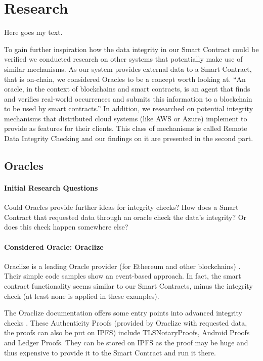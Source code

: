 \section{Research}

Here goes my text.

To gain further inspiration how the data integrity in our Smart Contract could be verified we conducted research on other systems that potentially make use of similar mechanisms. As our system provides external data to a Smart Contract, that is on-chain, we considered Oracles to be a concept worth looking at. “An oracle, in the context of blockchains and smart contracts, is an agent that finds and verifies real-world occurrences and submits this information to a blockchain to be used by smart contracts.” \cite{relatedWork01} In addition, we researched on potential integrity mechanisms that distributed cloud systems (like AWS or Azure) implement to provide as features for their clients. This class of mechanisms is called Remote Data Integrity Checking and our findings on it are presented in the second part.

\subsection{Oracles}

\paragraph{Initial Research Questions}
Could Oracles provide further ideas for integrity checks? How does a Smart Contract that requested data through an oracle check the data’s integrity? Or does this check happen somewhere else?

\paragraph{Considered Oracle: Oraclize}
Oraclize is a leading Oracle provider (for Ethereum and other blockchains) \cite{relatedWork02}. Their simple code samples \cite{relatedWork03} show an event-based approach. In fact, the smart contract functionality seems similar to our Smart Contracts, minus the integrity check (at least none is applied in these examples).

The Oraclize documentation offers some entry points into advanced integrity checks \cite{relatedWork04}. These Authenticity Proofs (provided by Oraclize with requested data, the proofs can also be put on IPFS) \cite{relatedWork05} include TLSNotaryProofs, Android Proofs and Ledger Proofs. They can be stored on IPFS as the proof may be huge and thus expensive to provide it to the Smart Contract and run it there. \cite{relatedWork06}

